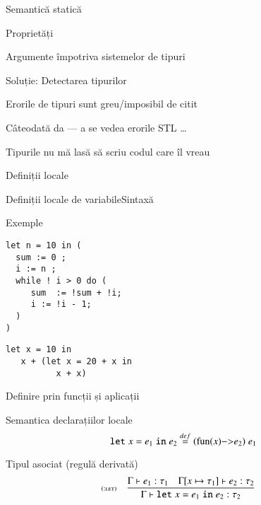 \begin{section}{Semantică statică}
\begin{subsection}{Proprietăți}
\begin{frame}{Argumente împotriva sistemelor de tipuri}
\begin{itemize}
    Soluție:  Detectarea tipurilor

   Erorile de tipuri sunt greu/imposibil de citit

     Câteodată da --- a se vedea erorile STL \ldots

   Tipurile nu mă lasă să scriu codul care îl vreau
\end{itemize}
\end{frame}

\end{subsection}

\begin{subsection}{Definiții locale}
\begin{frame}[fragile]{Definiții locale de variabile}{Sintaxă}
\vspace{-5ex}

\begin{block}{Exemple}
\begin{minipage}[t]{.35\columnwidth}
\begin{verbatim}
let n = 10 in (
  sum := 0 ;
  i := n ;
  while ! i > 0 do (
     sum  := !sum + !i;
     i := !i - 1;
  )
)
\end{verbatim}
\end{minipage}
\hfill\begin{minipage}[t]{.45\columnwidth}
\begin{verbatim}
let x = 10 in
   x + (let x = 20 + x in 
          x + x)
\end{verbatim}
\end{minipage}
\end{block}
\end{frame}

\begin{frame}{Definire prin funcții și aplicații}
\begin{block}{Semantica declarațiilor locale}
\[\Slet x = e_1 \Sin e_2  \stackrel{def}{=} (\fun{x}{e_2})\; e_1\]
\end{block}
\vfill
\begin{block}{Tipul asociat (regulă derivată)}
\[\reg[:let]{\T{\Gamma}{\Slet x = e_1 \Sin e_2}{\tau_2}}{\T{\Gamma}{e_1}{\tau_1} \si \T{\Gamma[x\mapsto \tau_1]}{e_2}{\tau_2}}{}\]
\end{block}
\end{frame}


\end{subsection}
\end{section}
